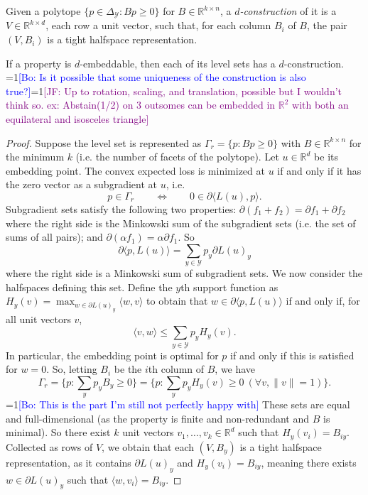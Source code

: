 \documentclass[anon,12pt]{colt2019}
\newcommand{\Comments}{1}
\newcommand{\mynote}[2]{\ifnum\Comments=1\textcolor{#1}{#2}\fi}
\newcommand{\jessie}[1]{\mynote{purple}{[JF: #1]}}
\newcommand{\bo}[1]{\mynote{blue}{[Bo: #1]}}
\newcommand{\reals}{\mathbb{R}}
\newcommand{\Y}{\mathcal{Y}}
\begin{document}
\begin{definition}\label{def:d-construction}
  Given a polytope $\{p \in \Delta_{\Y} : Bp \geq 0\}$ for $B \in \reals^{k \times n}$, a \emph{$d$-construction} of it is a $V \in \reals^{k \times d}$, each row a unit vector, such that, for each column $B_i$ of $B$, the pair $(V,B_i)$ is a tight halfspace representation.
\end{definition}

\begin{corollary}\label{cor:d-embed-implies-d-construction}
  If a property is $d$-embeddable, then each of its level sets has a $d$-construction.
  \bo{Is it possible that some uniqueness of the construction is also true?}\jessie{Up to rotation, scaling, and translation, possible but I wouldn't think so.  ex: Abstain(1/2) on 3 outsomes can be embedded in $\reals^2$ with both an equilateral and isosceles triangle}
\end{corollary}
\begin{proof}
  Suppose the level set is represented as $\Gamma_r = \{p : Bp \geq 0\}$ with $B \in \reals^{k \times n}$ for the minimum $k$ (i.e. the number of facets of the polytope).
  Let $u \in \reals^d$ be its embedding point.
  The convex expected loss is minimized at $u$ if and only if it has the zero vector as a subgradient at $u$, i.e.
    \[ p \in \Gamma_r \qquad \iff \qquad 0 \in \partial \langle L(u), p \rangle . \]
  Subgradient sets satisfy the following two properties: $\partial(f_1 + f_2) = \partial f_1 + \partial f_2$ where the right side is the Minkowski sum of the subgradient sets (i.e. the set of sums of all pairs); and $\partial(\alpha f_1) = \alpha \partial f_1$.
  So
    \[ \partial \langle p , L(u) \rangle = \sum_{y \in \Y} p_y \partial L(u)_y \]
  where the right side is a Minkowski sum of subgradient sets.
  We now consider the halfspaces defining this set.
  Define the $y$th support function as $H_y(v) = \max_{w \in \partial L(u)_y} \langle w, v \rangle$ to obtain that $w \in \partial \langle p, L(u) \rangle$ if and only if, for all unit vectors $v$,
   \[ \langle v, w \rangle \leq \sum_{y \in \Y} p_y H_y(v) . \]
  In particular, the embedding point is optimal for $p$ if and only if this is satisfied for $w=0$.
  So, letting $B_i$ be the $i$th column of $B$, we have
    \[ \Gamma_r = \{p : \sum_y p_y B_y \geq 0\} = \{p : \sum_y p_y H_y(v) \geq 0 ~ (\forall v, \|v\|=1)\} . \]
  \bo{This is the part I'm still not perfectly happy with}
  These sets are equal and full-dimensional (as the property is finite and non-redundant and $B$ is minimal).
  So there exist $k$ unit vectors $v_1,\dots,v_k \in \reals^d$ such that $H_y(v_i) = B_{iy}$.
  Collected as rows of $V$, we obtain that each $(V,B_y)$ is a tight halfspace representation, as it contains $\partial L(u)_y$ and $H_y(v_i) = B_{iy}$, meaning there exists $w \in \partial L(u)_y$ such that $\langle w, v_i \rangle = B_{iy}$.
\end{proof}
\end{document}
